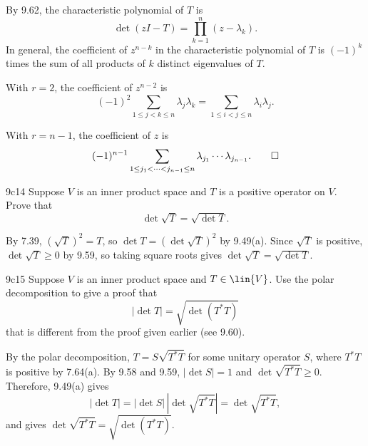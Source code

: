 \begin{sol}
    By 9.62, the characteristic polynomial of $T$ is
    \[
        \det(z I - T) = \prod_{k=1}^{n} (z - \lambda_k).
    \]
    In general, the coefficient of $z^{n-k}$ in the characteristic polynomial of $T$ is $(-1)^k$ times the sum of all products of $k$ distinct eigenvalues of $T$.
    \begin{subexercises}
        \item With $r = 2$, the coefficient of $z^{n-2}$ is
        \[
            (-1)^2 \sum_{1 \leq j < k \leq n} \lambda_j \lambda_k = \sum_{1 \leq i < j \leq n} \lambda_i \lambda_j.
        \]
        \item With $r = n-1$, the coefficient of $z$ is
        \[
            (-1)^{n-1} \sum_{1 \leq j_1 < \cdots < j_{n-1} \leq n} \lambda_{j_1} \cdots \lambda_{j_{n-1}}. \qedhere
        \]
    \end{subexercises}
\end{sol}

\begin{exercise}{9c14}
    Suppose $V$ is an inner product space and $T$ is a positive operator on $V$.
    Prove that
    \[
        \det \sqrt{T} = \sqrt{\det T}.
    \]
\end{exercise}

\begin{sol}
    By 7.39, $(\sqrt{T})^2 = T$, so $\det T = (\det \sqrt{T})^2$ by 9.49(a).
    Since $\sqrt{T}$ is positive, $\det \sqrt{T} \geq 0$ by 9.59, so taking square roots gives $\det \sqrt{T} = \sqrt{\det T}$.
\end{sol}

\begin{exercise}{9c15}
    Suppose $V$ is an inner product space and $T \in \lin{V}$.
    Use the polar decomposition to give a proof that
    \[
        |\det T| = \sqrt{\det(T^\ast T)}
    \]
    that is different from the proof given earlier (see 9.60).
\end{exercise}

\begin{sol}
    By the polar decomposition, $T = S \sqrt{T^\ast T}$ for some unitary operator $S$, where $T^\ast T$ is positive by 7.64(a).
    By 9.58 and 9.59, $|\det S| = 1$ and $\det \sqrt{T^\ast T} \geq 0$.
    Therefore, 9.49(a) gives
    \[
        |\det T| = |\det S|\,|\det \sqrt{T^\ast T}| = \det \sqrt{T^\ast T},
    \]
    and  gives $\det \sqrt{T^\ast T} = \sqrt{\det(T^\ast T)}$.
\end{sol}

